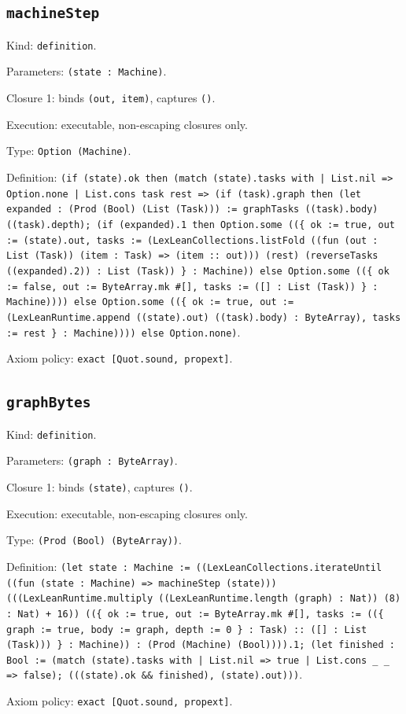 \documentclass[11pt]{article}
\begin{document}
\subsection*{\texttt{machineStep}}
\noindent Kind: \texttt{definition}.\par
\noindent Parameters: \texttt{(state : Machine)}.\par
\noindent Closure 1: binds \texttt{(out, item)}, captures \texttt{()}.\par
\noindent Execution: executable, non-escaping closures only.\par
\noindent Type: \texttt{Option (Machine)}.\par
\noindent Definition: \texttt{(if (state).ok then (match (state).tasks with | List.nil => Option.none | List.cons task rest => (if (task).graph then (let expanded : (Prod (Bool) (List (Task))) := graphTasks ((task).body) ((task).depth); (if (expanded).1 then Option.some ((\{ ok := true, out := (state).out, tasks := (LexLeanCollections.listFold ((fun (out : List (Task)) (item : Task) => (item :: out))) (rest) (reverseTasks ((expanded).2)) : List (Task)) \} : Machine)) else Option.some ((\{ ok := false, out := ByteArray.mk \#[], tasks := ([] : List (Task)) \} : Machine)))) else Option.some ((\{ ok := true, out := (LexLeanRuntime.append ((state).out) ((task).body) : ByteArray), tasks := rest \} : Machine)))) else Option.none)}.\par
\noindent Axiom policy: \texttt{exact [Quot.sound, propext]}.\par
\subsection*{\texttt{graphBytes}}
\noindent Kind: \texttt{definition}.\par
\noindent Parameters: \texttt{(graph : ByteArray)}.\par
\noindent Closure 1: binds \texttt{(state)}, captures \texttt{()}.\par
\noindent Execution: executable, non-escaping closures only.\par
\noindent Type: \texttt{(Prod (Bool) (ByteArray))}.\par
\noindent Definition: \texttt{(let state : Machine := ((LexLeanCollections.iterateUntil ((fun (state : Machine) => machineStep (state))) (((LexLeanRuntime.multiply ((LexLeanRuntime.length (graph) : Nat)) (8) : Nat) + 16)) ((\{ ok := true, out := ByteArray.mk \#[], tasks := ((\{ graph := true, body := graph, depth := 0 \} : Task) :: ([] : List (Task))) \} : Machine)) : (Prod (Machine) (Bool)))).1; (let finished : Bool := (match (state).tasks with | List.nil => true | List.cons \_ \_ => false); (((state).ok \&\& finished), (state).out)))}.\par
\noindent Axiom policy: \texttt{exact [Quot.sound, propext]}.\par
\end{document}
